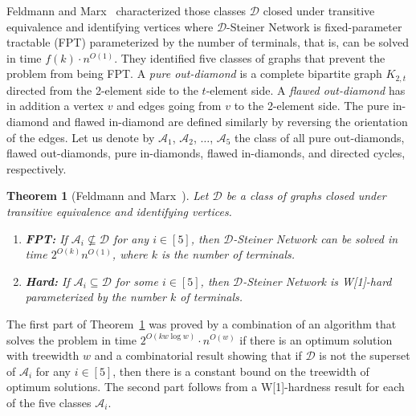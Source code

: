 \documentclass[a4paper,11pt]{article}
\newcommand{\calD}{\mathcal{D}}
\theoremstyle{plain}
\newtheorem{theorem}{Theorem}[section]
\newtheorem{identification rule}{Identification Rule}
\theoremstyle{definition}
\theoremstyle{remark}
\newcommand{\Dsngenfull}{{\sc $\calD$-Steiner Network}\xspace}
\newcommand{\oldC}{\mathcal{A}}
\begin{document}
Feldmann and Marx~\cite{FeldmannM16} characterized those classes $\calD$ closed under transitive equivalence and identifying vertices where \Dsngenfull is fixed-parameter tractable (FPT) parameterized by the number of terminals, that is, can be solved in time $f(k)\cdot n^{O(1)}$. They identified five classes of graphs that prevent the problem from being FPT. A \emph{pure out-diamond} is a complete bipartite graph $K_{2,t}$ directed from the 2-element side to the $t$-element side. A \emph{flawed out-diamond} has in addition  a vertex $v$ and edges going from $v$ to the 2-element side. The pure in-diamond and flawed in-diamond are defined similarly by reversing the orientation of the edges. 
Let us denote by $\oldC_1$, $\oldC_2$, $\dots$, $\oldC_5$ the class of all pure out-diamonds, flawed out-diamonds,
pure in-diamonds, flawed in-diamonds, and directed cycles, respectively.
\begin{theorem}[Feldmann and Marx~\cite{FeldmannM16}]\label{thm:gengraphs}
  Let $\calD$ be a class of graphs closed under transitive equivalence and identifying vertices.
  \begin{enumerate}
\item \textbf{FPT:}   If $\oldC_i\not\subseteq \calD$ for any $i\in [5]$, then \Dsngenfull can be solved in time $2^{O(k)}n^{O(1)}$, where $k$ is the number of terminals.
\item \textbf{Hard:}   If $\oldC_i\subseteq\calD$ for some $i\in [5]$, then \Dsngenfull is W[1]-hard parameterized by the number $k$ of terminals.
  \end{enumerate}
\end{theorem}
The first part of Theorem~\ref{thm:gengraphs} was proved by a combination of an algorithm that solves the problem in time $2^{O(kw\log w)}\cdot n^{O(w)}$ if there is an optimum solution with treewidth $w$ and a combinatorial result showing that if $\calD$ is not the superset of $\oldC_i$ for any $i\in[5]$, then there is a constant bound on the treewidth of optimum solutions. The second part follows from a W[1]-hardness result for each of the five classes $\oldC_i$.
\end{document}
